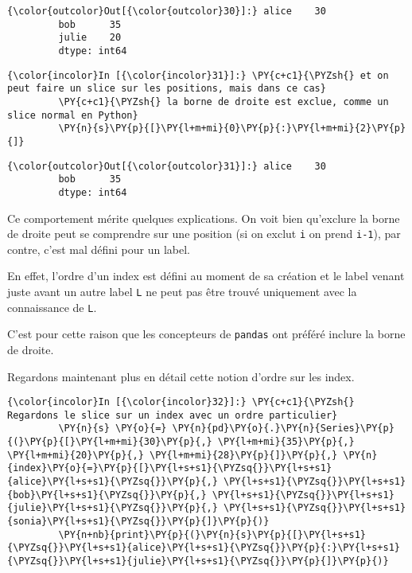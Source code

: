 \begin{Verbatim}[commandchars=\\\{\}]
{\color{outcolor}Out[{\color{outcolor}30}]:} alice    30
         bob      35
         julie    20
         dtype: int64
\end{Verbatim}
            
    \begin{Verbatim}[commandchars=\\\{\}]
{\color{incolor}In [{\color{incolor}31}]:} \PY{c+c1}{\PYZsh{} et on peut faire un slice sur les positions, mais dans ce cas}
         \PY{c+c1}{\PYZsh{} la borne de droite est exclue, comme un slice normal en Python}
         \PY{n}{s}\PY{p}{[}\PY{l+m+mi}{0}\PY{p}{:}\PY{l+m+mi}{2}\PY{p}{]}
\end{Verbatim}


\begin{Verbatim}[commandchars=\\\{\}]
{\color{outcolor}Out[{\color{outcolor}31}]:} alice    30
         bob      35
         dtype: int64
\end{Verbatim}
            
    Ce comportement mérite quelques explications. On voit bien qu'exclure la
borne de droite peut se comprendre sur une position (si on exclut
\texttt{i} on prend \texttt{i-1}), par contre, c'est mal défini pour un
label.

En effet, l'ordre d'un index est défini au moment de sa création et le
label venant juste avant un autre label \texttt{L} ne peut pas être
trouvé uniquement avec la connaissance de \texttt{L}.

C'est pour cette raison que les concepteurs de \texttt{pandas} ont
préféré inclure la borne de droite.

Regardons maintenant plus en détail cette notion d'ordre sur les index.

    \begin{Verbatim}[commandchars=\\\{\}]
{\color{incolor}In [{\color{incolor}32}]:} \PY{c+c1}{\PYZsh{} Regardons le slice sur un index avec un ordre particulier}
         \PY{n}{s} \PY{o}{=} \PY{n}{pd}\PY{o}{.}\PY{n}{Series}\PY{p}{(}\PY{p}{[}\PY{l+m+mi}{30}\PY{p}{,} \PY{l+m+mi}{35}\PY{p}{,} \PY{l+m+mi}{20}\PY{p}{,} \PY{l+m+mi}{28}\PY{p}{]}\PY{p}{,} \PY{n}{index}\PY{o}{=}\PY{p}{[}\PY{l+s+s1}{\PYZsq{}}\PY{l+s+s1}{alice}\PY{l+s+s1}{\PYZsq{}}\PY{p}{,} \PY{l+s+s1}{\PYZsq{}}\PY{l+s+s1}{bob}\PY{l+s+s1}{\PYZsq{}}\PY{p}{,} \PY{l+s+s1}{\PYZsq{}}\PY{l+s+s1}{julie}\PY{l+s+s1}{\PYZsq{}}\PY{p}{,} \PY{l+s+s1}{\PYZsq{}}\PY{l+s+s1}{sonia}\PY{l+s+s1}{\PYZsq{}}\PY{p}{]}\PY{p}{)}
         \PY{n+nb}{print}\PY{p}{(}\PY{n}{s}\PY{p}{[}\PY{l+s+s1}{\PYZsq{}}\PY{l+s+s1}{alice}\PY{l+s+s1}{\PYZsq{}}\PY{p}{:}\PY{l+s+s1}{\PYZsq{}}\PY{l+s+s1}{julie}\PY{l+s+s1}{\PYZsq{}}\PY{p}{]}\PY{p}{)}
\end{Verbatim}


